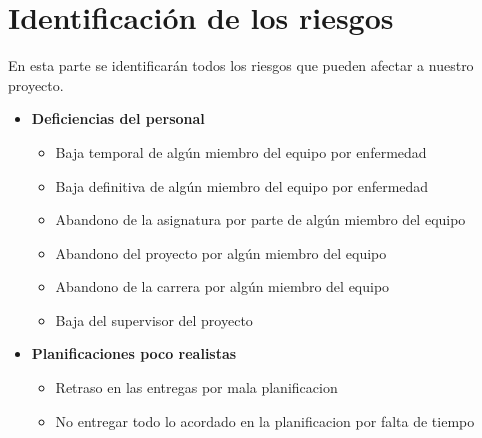 \documentclass[spanish,a4paper,11pt, twoside]{report}	%
\begin{document}
\newpage
\mbox{}
\thispagestyle{empty}						%
\newpage


\tableofcontents 							%

\setcounter{section}{0}

\part{Identificación de los riesgos}
En esta parte se identificarán todos los riesgos que pueden afectar a nuestro proyecto.
\begin{itemize}
\item \textbf {Deficiencias del personal}
	\begin{itemize}
		\item {Baja temporal de algún miembro del equipo por enfermedad}
		\item {Baja definitiva de algún miembro del equipo por enfermedad}
		\item {Abandono de la asignatura por parte de algún miembro del equipo}
		\item {Abandono del proyecto por algún miembro del equipo}
		\item {Abandono de la carrera por algún miembro del equipo}
		\item {Baja del supervisor del proyecto}
	\end{itemize}
\item \textbf {Planificaciones poco realistas}
	\begin{itemize}
		\item {Retraso en las entregas por mala planificacion}
		\item {No entregar todo lo acordado en la planificacion por falta de tiempo}


\end{itemize}
\end{itemize}
\end{document}
